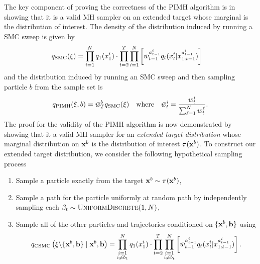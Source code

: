The key component of proving the correctness of the PIMH algorithm is in showing that it is a valid
MH sampler on an extended target whose marginal is the distribution of interest.
The density of the distribution induced by running a SMC sweep is given by
\begin{align}
\label{eq:part:smc:proposal}
q_{\text{SMC}}(\mathbf{\xi}) &= \prod_{i=1}^N q_1(x_{1}^i) \cdot \prod_{t=2}^T \prod_{i=1}^N \left[ 
\bar w_{t-1}^{a_{t-1}^i}
q_t(x_{t}^i|x_{1:t-1}^{a_{t-1}^i}) \right]
\end{align}
and the distribution induced by running an SMC sweep and then sampling particle $b$ from the
sample set is 
\begin{align}
q_{\text{PIMH}}(\mathbf{\xi},b) = \bar{w}_T^b q_{\text{SMC}}(\mathbf{\xi}) \quad \text{where} \quad \bar{w}_t^i = \frac{{w}_t^i}{\sum_{\ell=1}^{N}w_t^{\ell}}.
\end{align}
The proof for the validity of the PIMH
algorithm is now demonstrated by showing that it a valid MH sampler for an \emph{extended target distribution}
whose marginal distribution on $\mathbf{x}^b$ is the distribution of interest $\pi(\mathbf{x}^b)$.  To construct our
extended target distribution, we consider the following hypothetical sampling process
\begin{enumerate}
	\item Sample a particle exactly from the target $\mathbf{x}^b \sim \pi(\mathbf{x}^b)$,
	\item Sample a path for the particle uniformly at random path by independently sampling each $\beta_t \sim \textsc{UniformDiscrete}(1,N)$,
	\item Sample all of the other particles and trajectories conditioned on $\{\mathbf{x}^{b},\mathbf{b}\}$ using \begin{align}
	\label{eq:part:csmc}
	q_{\text{CSMC}}\left(\mathbf{\xi} \backslash \{\mathbf{x}^b, \mathbf{b}\} \mid \mathbf{x}^b, \mathbf{b} \right) = 
	\prod_{\substack{i=1\\i\neq b_{1}}}^N  q_1(x_{1}^i) \cdot \prod_{t=2}^T \prod_{\substack{i=1\\i\neq b_{t}}}^N \left[
	\bar w_{t-1}^{a_{t-1}^i}q_t(x_{t}^i|x_{1:t-1}^{a_{t-1}^i})\right].
	\end{align}
\end{enumerate}
